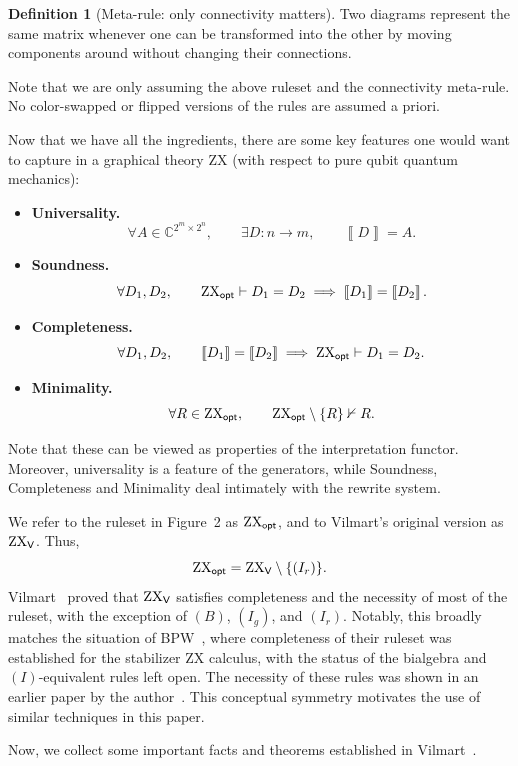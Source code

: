 \documentclass[copyright,creativecommons]{eptcs}
\newcommand{\zxopt}{\ensuremath{\textup{ZX}_{\textsf{opt}}}\xspace}
\newcommand{\zxv}{\ensuremath{\textup{ZX}_{\textsf{V}}}\xspace}
\newcommand{\intf}[1]{\ensuremath{\left\llbracket #1 \right\rrbracket}}
\theoremstyle{definition}
\newtheorem{definition}[theorem]{Definition}
\theoremstyle{remark}
\begin{document}
\begin{definition}[Meta-rule: only connectivity matters]
\label{def:connectivity-meta-rule}
Two diagrams represent the same matrix whenever one can be transformed into the other by moving components around without changing their connections.
\end{definition}

Note that we are only assuming the above ruleset and the connectivity meta-rule.  No color-swapped or flipped versions of the rules are assumed a priori.

Now that we have all the ingredients, there are some key features one would want to capture in a graphical theory \(\mathrm{ZX}\) (with respect to pure qubit quantum mechanics):

\begin{itemize}
\item \textbf{Universality.}
\[
\forall A\in \mathbb C^{2^m\times 2^n},\qquad \exists D:n\to m,\qquad \intf{D}=A.
\]
\item \textbf{Soundness.}
\[
\forall D_1,D_2,\qquad \zxopt\vdash D_1=D_2\implies \intf{D_1}=\intf{D_2}.
\]
\item \textbf{Completeness.}
\[
\forall D_1,D_2,\qquad \intf{D_1}=\intf{D_2}\implies \zxopt\vdash D_1=D_2.
\]
\item \textbf{Minimality.}
\[
\forall R\in \zxopt,\qquad \zxopt\setminus\{R\}\nvdash R.
\]
\end{itemize}

Note that these can be viewed as properties of the interpretation functor.  Moreover, universality is a feature of the generators, while Soundness, Completeness and Minimality deal intimately with the rewrite system.

We refer to the ruleset in Figure~2 as \(\zxopt\), and to Vilmart's original version as \(\zxv\). Thus,
\[
\zxopt=\zxv\setminus\{(I_r)\}.
\]
Vilmart~\cite{8785765} proved that \(\zxv\) satisfies completeness and the necessity of most of the ruleset, with the exception of \((B)\), \((I_g)\), and \hyperref[eq:ir-rule-derivable]{\((I_r)\)}.  Notably, this broadly matches the situation of BPW~\cite{Backens_2020}, where completeness of their ruleset was established for the stabilizer ZX calculus, with the status of the bialgebra and \((I)\)-equivalent rules left open.  The necessity of these rules was shown in an earlier paper by the author~\cite{stoltz2026simplified}.  This conceptual symmetry motivates the use of similar techniques in this paper.

Now, we collect some important facts and theorems established in Vilmart~\cite{8785765}.
\end{document}
